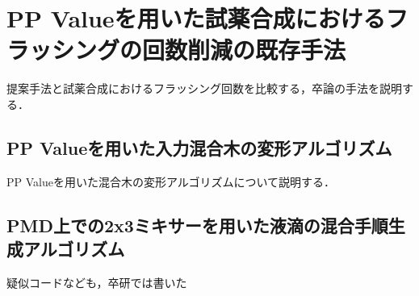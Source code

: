 \chapter{PP Valueを用いた試薬合成におけるフラッシングの回数削減の既存手法}
提案手法と試薬合成におけるフラッシング回数を比較する，卒論の手法を説明する．
\section{PP Valueを用いた入力混合木の変形アルゴリズム}
PP Valueを用いた混合木の変形アルゴリズムについて説明する．
\section{PMD上での2x3ミキサーを用いた液滴の混合手順生成アルゴリズム}
疑似コードなども，卒研では書いた
